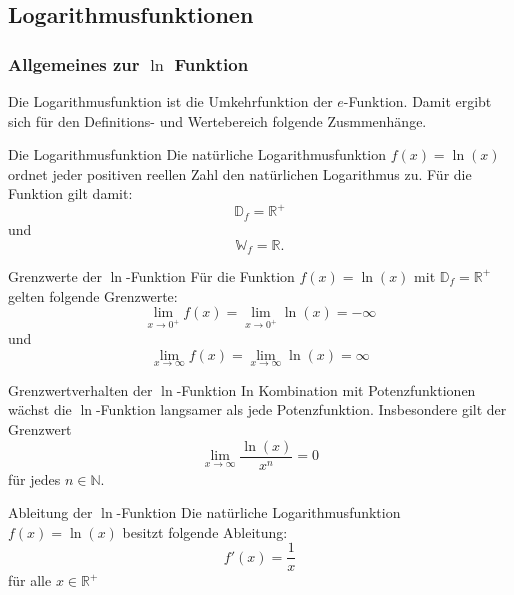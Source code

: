  \subsection{Logarithmusfunktionen}
 \subsubsection{Allgemeines zur $\ln{}$ Funktion}
 Die Logarithmusfunktion ist die Umkehrfunktion der $e$-Funktion. Damit ergibt sich für den Definitions- und Wertebereich folgende Zusmmenhänge.
 \begin{satz}{Die Logarithmusfunktion}{}
Die natürliche Logarithmusfunktion $f(x) = \ln{(x)}$ ordnet jeder positiven reellen Zahl den natürlichen Logarithmus zu. Für die Funktion gilt damit: $$\mathds{D}_f = \mathds{R}^+$$ und $$\mathds{W}_f = \mathds{R}.$$
 \end{satz}
 \begin{center}
\end{center}
\begin{bem}{Grenzwerte der $\ln$-Funktion}{}
Für die Funktion $f(x) = \ln{(x)}$ mit $\mathds{D}_f = \mathds{R}^+$ gelten folgende Grenzwerte:
$$\lim_{x \longrightarrow 0^+} f(x) = \lim_{x \longrightarrow 0^+} \ln{(x)} = -\infty$$ und $$\lim_{x \longrightarrow \infty} f(x) = \lim_{x \longrightarrow \infty} \ln{(x)} = \infty$$
\end{bem}
\begin{satz}{Grenzwertverhalten der $\ln{}$-Funktion}{}
In Kombination mit Potenzfunktionen wächst die $\ln{}$-Funktion langsamer als jede Potenzfunktion. Insbesondere gilt der Grenzwert $$\lim_{x\longrightarrow \infty} \dfrac{\ln{(x)}}{x^n} = 0$$ für jedes $n\in \mathds{N}$.
\end{satz}
\begin{satz}{Ableitung der $\ln$-Funktion}{} 
Die natürliche Logarithmusfunktion $f(x) = \ln{(x)}$ besitzt folgende Ableitung: $$f'(x) = \dfrac{1}{x}$$ für alle $x\in \mathds{R}^+$
\end{satz}
